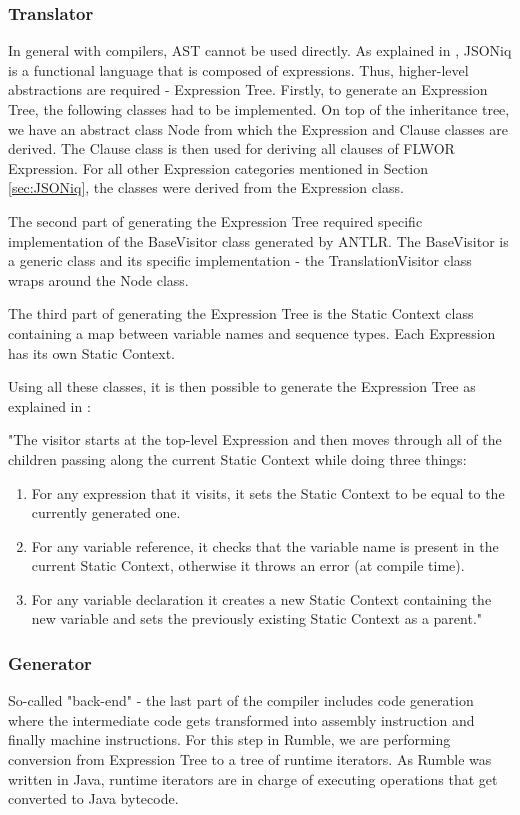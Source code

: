 \subsubsection{Translator}
In general with compilers, AST cannot be used directly. As explained in \cite{RumbleMLThesis}, JSONiq is a functional language that is composed of expressions. Thus, higher-level abstractions are required - Expression Tree. Firstly, to generate an Expression Tree, the following classes had to be implemented. On top of the inheritance tree, we have an abstract class Node from which the Expression and Clause classes are derived. The Clause class is then used for deriving all clauses of FLWOR Expression. For all other Expression categories mentioned in Section \ref{sec:JSONiq}, the classes were derived from the Expression class. 

The second part of generating the Expression Tree required specific implementation of the BaseVisitor class generated by ANTLR. The BaseVisitor is a generic class and its specific implementation - the TranslationVisitor class wraps around the Node class. 

The third part of generating the Expression Tree is the Static Context class containing a map between variable names and sequence types. Each Expression has its own Static Context.

Using all these classes, it is then possible to generate the Expression Tree as explained in \cite{RumbleThesis}: 

"The visitor starts at the top-level Expression and then moves through all of the children passing along the current Static Context while doing three things:
\begin{enumerate}
	\item For any expression that it visits, it sets the Static Context to be equal to the currently generated one.
	\item For any variable reference, it checks that the variable name is present in the current Static Context, otherwise it throws an error (at compile time).
	\item For any variable declaration it creates a new Static Context containing the new variable and sets the previously existing Static Context as a parent."
\end{enumerate}

\subsubsection{Generator}
\label{sec:Generator}
So-called "back-end" - the last part of the compiler includes code generation where the intermediate code gets transformed into assembly instruction and finally machine instructions. For this step in Rumble, we are performing conversion from Expression Tree to a tree of runtime iterators. As Rumble was written in Java, runtime iterators are in charge of executing operations that get converted to Java bytecode.

